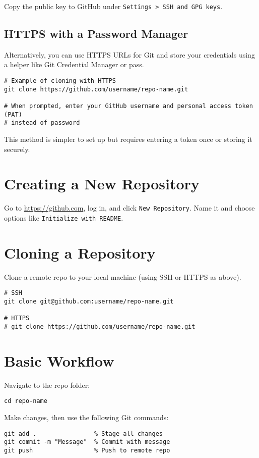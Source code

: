 \documentclass[11pt]{article}
\begin{document}
Copy the public key to GitHub under \texttt{Settings > SSH and GPG keys}.

\subsection{HTTPS with a Password Manager}
Alternatively, you can use HTTPS URLs for Git and store your credentials using a helper like Git Credential Manager or pass.

\begin{lstlisting}
# Example of cloning with HTTPS
git clone https://github.com/username/repo-name.git

# When prompted, enter your GitHub username and personal access token (PAT) 
# instead of password
\end{lstlisting}

This method is simpler to set up but requires entering a token once or storing it securely.

\section{Creating a New Repository}
Go to \url{https://github.com}, log in, and click \texttt{New Repository}. Name it and choose options like \texttt{Initialize with README}.

\section{Cloning a Repository}
Clone a remote repo to your local machine (using SSH or HTTPS as above).

\begin{lstlisting}
# SSH
git clone git@github.com:username/repo-name.git

# HTTPS
# git clone https://github.com/username/repo-name.git
\end{lstlisting}

\section{Basic Workflow}
Navigate to the repo folder:

\begin{lstlisting}
cd repo-name
\end{lstlisting}

\noindent Make changes, then use the following Git commands:

\begin{lstlisting}
git add .                % Stage all changes
git commit -m "Message"  % Commit with message
git push                 % Push to remote repo
\end{lstlisting}
\end{document}
